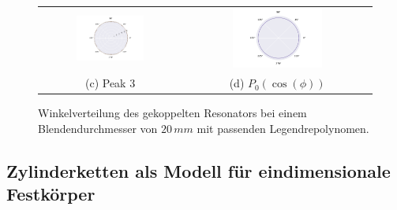 \begin{figure}[H]
\begin{tabular}{cc}
  \includegraphics[width=0.5\textwidth]{Daten/Wasserstoffmolekuelion/peak2.pdf} &   \includegraphics[width=0.5\textwidth]{Daten/Wasserstoffmolekuelion/peakLeg.pdf}\\[6pt]
  (c)  Peak 3 & (d)  $P_0(\cos(\phi))$ \\[6pt]
  \end{tabular}
  \caption{Winkelverteilung des gekoppelten Resonators bei einem Blendendurchmesser von $20\, mm$ mit passenden Legendrepolynomen.} 
  \label{fig:h2_2}
\end{figure}
\subsection{Zylinderketten als Modell für eindimensionale Festkörper}
